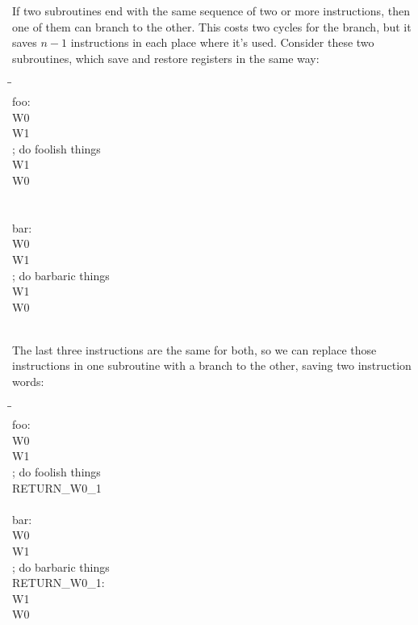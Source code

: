 If two subroutines end with the same sequence of two or more instructions,
then one of them can branch to the other.  This costs two cycles for the
branch, but it saves $n-1$ instructions in each place where it's used. 
Consider these two subroutines, which save and restore registers in the same
way:

\pagebreak

\begin{tabbing}
\qquad\=\qquad\qquad\=\kill
\\
foo:\\
\>\>W0\\
\>\>W1\\
\>; do foolish things\\
\>\>W1\\
\>\>W0\\
\>\\
\\
bar:\\
\>\>W0\\
\>\>W1\\
\>; do barbaric things\\
\>\>W1\\
\>\>W0\\
\>\\
\end{tabbing}

The last three instructions are the same for both, so we can replace
those instructions in one subroutine with a branch to the other, saving two
instruction words:

\begin{tabbing}
\qquad\=\qquad\qquad\=\kill
\\
foo:\\
\>\>W0\\
\>\>W1\\
\>; do foolish things\\
\>\>RETURN\_W0\_1\\
\\
bar:\\
\>\>W0\\
\>\>W1\\
\>; do barbaric things\\
RETURN\_W0\_1:\\
\>\>W1\\
\>\>W0\\
\>\\
\end{tabbing}

